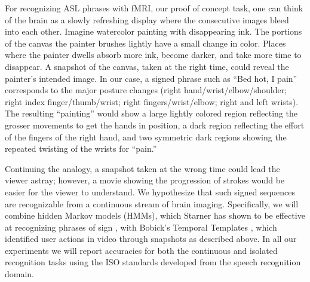 \documentclass{proposal}
\begin{document}

For recognizing ASL phrases with fMRI, our proof of concept task, one can think of the brain as a slowly refreshing display where the consecutive images bleed into each other.  Imagine watercolor painting with disappearing ink.  The portions of the canvas the painter brushes lightly have a small change in color. Places where the painter dwells absorb more ink, become darker, and take more time to disappear.  A snapshot of the canvas, taken at the right time, could reveal the painter's intended image. In our case, a signed phrase such as ``Bed hot, I pain'' corresponds to the major posture changes (right hand/wrist/elbow/shoulder; right index finger/thumb/wrist; right fingers/wrist/elbow; right and left wrists).  The resulting ``painting'' would show a large lightly colored region reflecting the grosser movements to get the hands in position, a dark region reflecting the effort of the fingers of the right hand, and two symmetric dark regions showing the repeated twisting of the wrists for ``pain.''

Continuing the analogy, a snapshot taken at the wrong time could lead the viewer astray; however, a movie showing the progression of strokes would be easier for the viewer to understand.  We hypothesize that such signed sequences are recognizable from a continuous stream of brain imaging.  Specifically, we will combine hidden Markov models (HMMs),
which Starner has shown to be effective at recognizing phrases of sign \cite{starner1998rta}, with Bobick's Temporal Templates \cite{bobick2001rhm}, which identified user actions in video through snapshots as described above. In all our experiments we will report accuracies for both the continuous and isolated recognition tasks using the ISO standards developed from the speech recognition domain.

\end{document}
